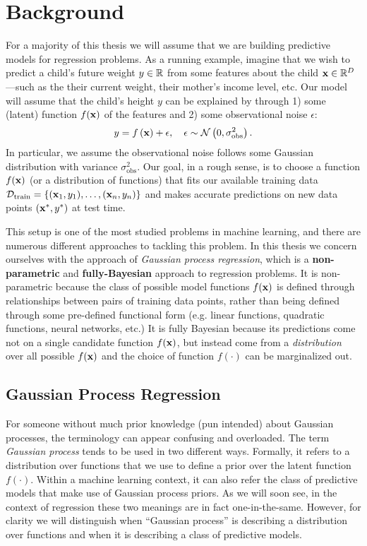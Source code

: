 \chapter{Background}

For a majority of this thesis we will assume that we are building predictive models for regression problems.
As a running example, imagine that we wish to predict a child's future weight $y \in \mathbb{R}$ from some features about the child $\mathbf{x} \in \mathbb{R}^{D}$---such as the their current weight, their mother's income level, etc.
Our model will assume that the child's height $y$ can be explained by through 1) some (latent) function $f(\mathbf{x})$ of the features and 2) some observational noise $\epsilon$:
%
\begin{equation}
  y = f \left( \mathbf{x} \right) + \epsilon, \quad \epsilon \sim \mathcal{N} \left( 0, \sigma_\text{obs}^2 \right).
  \label{eqn:regression}
\end{equation}
%
In particular, we assume the observational noise follows some Gaussian distribution with variance $\sigma_\text{obs}^2$.
Our goal, in a rough sense, is to choose a function $f(\mathbf{x})$ (or a distribution of functions) that fits our available training data $\mathcal D_\text{train} = \{(\mathbf{x}_1, y_1), \ldots, (\mathbf{x}_n, y_n)\}$ and makes accurate predictions on new data points $( \mathbf{x}^*, y^* )$ at test time.

This setup is one of the most studied problems in machine learning, and there are numerous different approaches to tackling this problem.
In this thesis we concern ourselves with the approach of \emph{Gaussian process regression}, which is a {\bf non-parametric} and {\bf fully-Bayesian} approach to regression problems.
It is non-parametric because the class of possible model functions $f(\mathbf{x})$ is defined through relationships between pairs of training data points,
rather than being defined through some pre-defined functional form (e.g. linear functions, quadratic functions, neural networks, etc.)
It is fully Bayesian because its predictions come not on a single candidate function $f(\mathbf{x})$,
but instead come from a \emph{distribution} over all possible $f(\mathbf{x})$ and the choice of function $f(\cdot)$ can be marginalized out.

\section{Gaussian Process Regression}

For someone without much prior knowledge (pun intended) about Gaussian processes, the terminology can appear confusing and overloaded.
The term \emph{Gaussian process} tends to be used in two different ways.
Formally, it refers to a distribution over functions that we use to define a prior over the latent function $f(\cdot)$.
Within a machine learning context, it can also refer the class of predictive models that make use of Gaussian process priors.
As we will soon see, in the context of regression these two meanings are in fact one-in-the-same.
However, for clarity we will distinguish when ``Gaussian process'' is describing a distribution over functions and when it is describing a class of predictive models.

